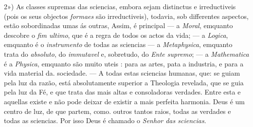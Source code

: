 2») As classes supremas das sciencias, embora sejam distinctus e irreductiveis (pois os seus objectos \emph{formaes} são irreductiveis), todavia, sob differentes aspectos, estão sobordinadas umas ás outras, Assim, é principal --- a \emph{Moral}, emquanto descobre o \emph{fim ultimo}, que é a regra de todos os actos da vida; --- a \emph{Logica}, emquanto é o \emph{instrumento} de todas as sciencias --- a \emph{Metaphysica}, emquanto trata do \emph{absoluto}, do \emph{immutavel} e, sobretudo, do \emph{Ente supremo}; --- a \emph{Mathematica} é a \emph{Physica}, emquanto são muito uteis : para as artes, pata a industria, e para a vida material da. sociedade. --- A todas estas sciencias humanas, que: se guiam pela luz da razão, está absolutamente superior a Theologia revelada, que se guia pela luz da Fé, e que trata das mais altas e consoladoras verdades. Entre esta e aquellas existe e não pode deixar de existir a mais perfeita harmonia. Deus é um centro de luz, de que partem, como. outros tantos raios, todas as verdades e todas as sciencias. Por isso Deus é chamado o \emph{Senhor das sciencias}.

    
